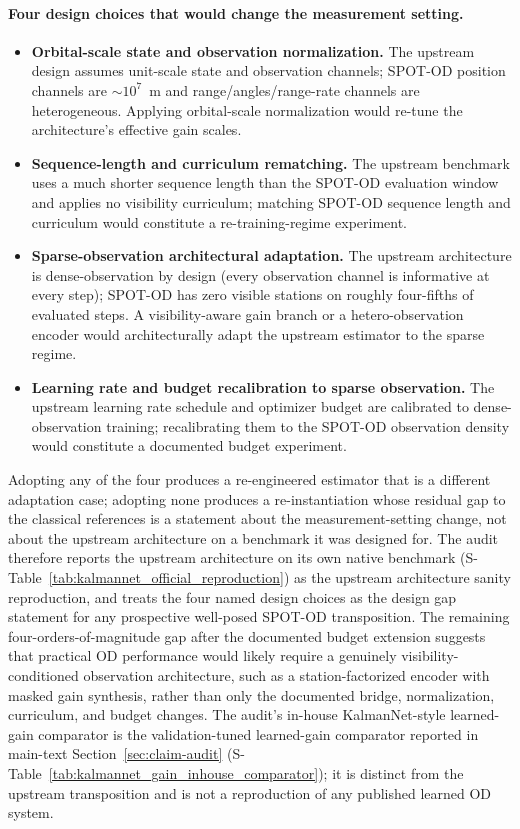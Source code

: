 \documentclass{article}
\begin{document}
\paragraph{Four design choices that would change the measurement setting.}
\begin{itemize}[leftmargin=*]
  \item \textbf{Orbital-scale state and observation normalization.} The upstream design assumes unit-scale state and observation channels; SPOT-OD position channels are $\sim 10^7$~m and range/angles/range-rate channels are heterogeneous. Applying orbital-scale normalization would re-tune the architecture's effective gain scales.
  \item \textbf{Sequence-length and curriculum rematching.} The upstream benchmark uses a much shorter sequence length than the SPOT-OD evaluation window and applies no visibility curriculum; matching SPOT-OD sequence length and curriculum would constitute a re-training-regime experiment.
  \item \textbf{Sparse-observation architectural adaptation.} The upstream architecture is dense-observation by design (every observation channel is informative at every step); SPOT-OD has zero visible stations on roughly four-fifths of evaluated steps. A visibility-aware gain branch or a hetero-observation encoder would architecturally adapt the upstream estimator to the sparse regime.
  \item \textbf{Learning rate and budget recalibration to sparse observation.} The upstream learning rate schedule and optimizer budget are calibrated to dense-observation training; recalibrating them to the SPOT-OD observation density would constitute a documented budget experiment.
\end{itemize}
Adopting any of the four produces a re-engineered estimator that is a different adaptation case; adopting none produces a re-instantiation whose residual gap to the classical references is a statement about the measurement-setting change, not about the upstream architecture on a benchmark it was designed for. The audit therefore reports the upstream architecture on its own native benchmark (S-Table~\ref{tab:kalmannet_official_reproduction}) as the upstream architecture sanity reproduction, and treats the four named design choices as the design gap statement for any prospective well-posed SPOT-OD transposition. The remaining four-orders-of-magnitude gap after the documented budget extension suggests that practical OD performance would likely require a genuinely visibility-conditioned observation architecture, such as a station-factorized encoder with masked gain synthesis, rather than only the documented bridge, normalization, curriculum, and budget changes. The audit's in-house KalmanNet-style learned-gain comparator is the validation-tuned learned-gain comparator reported in main-text Section~\ref{sec:claim-audit} (S-Table~\ref{tab:kalmannet_gain_inhouse_comparator}); it is distinct from the upstream transposition and is not a reproduction of any published learned OD system.
\end{document}
